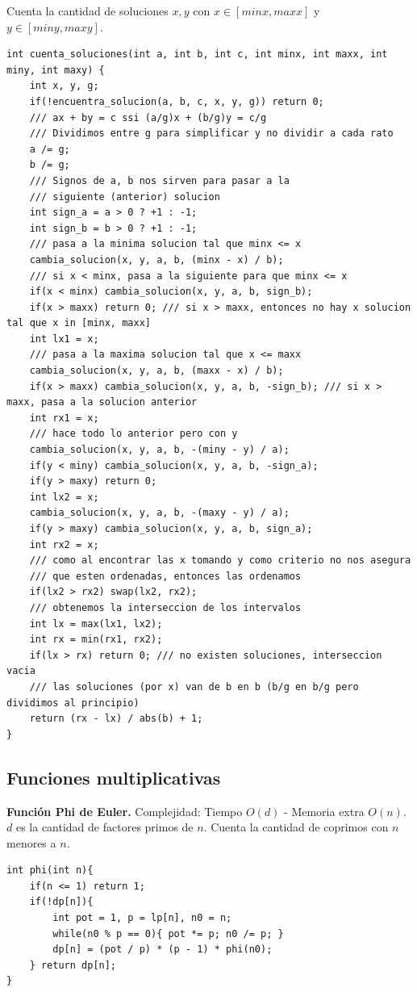\documentclass[10pt,spanish,mexico]{article}
\numberwithin{equation}{section}
\begin{document}
\begin{multicols}{2}
Cuenta la cantidad de soluciones $x, y$ con $x \in [minx, maxx]$ y $y \in [miny, maxy]$.
\begin{verbatim}
int cuenta_soluciones(int a, int b, int c, int minx, int maxx, int miny, int maxy) {
    int x, y, g;
    if(!encuentra_solucion(a, b, c, x, y, g)) return 0;
    /// ax + by = c ssi (a/g)x + (b/g)y = c/g
    /// Dividimos entre g para simplificar y no dividir a cada rato
    a /= g;
    b /= g;
    /// Signos de a, b nos sirven para pasar a la
    /// siguiente (anterior) solucion
    int sign_a = a > 0 ? +1 : -1;
    int sign_b = b > 0 ? +1 : -1;
    /// pasa a la minima solucion tal que minx <= x
    cambia_solucion(x, y, a, b, (minx - x) / b);
    /// si x < minx, pasa a la siguiente para que minx <= x
    if(x < minx) cambia_solucion(x, y, a, b, sign_b);
    if(x > maxx) return 0; /// si x > maxx, entonces no hay x solucion tal que x in [minx, maxx]
    int lx1 = x;
    /// pasa a la maxima solucion tal que x <= maxx
    cambia_solucion(x, y, a, b, (maxx - x) / b);
    if(x > maxx) cambia_solucion(x, y, a, b, -sign_b); /// si x > maxx, pasa a la solucion anterior
    int rx1 = x;
    /// hace todo lo anterior pero con y
    cambia_solucion(x, y, a, b, -(miny - y) / a);
    if(y < miny) cambia_solucion(x, y, a, b, -sign_a);
    if(y > maxy) return 0;
    int lx2 = x;
    cambia_solucion(x, y, a, b, -(maxy - y) / a);
    if(y > maxy) cambia_solucion(x, y, a, b, sign_a);
    int rx2 = x;
    /// como al encontrar las x tomando y como criterio no nos asegura
    /// que esten ordenadas, entonces las ordenamos
    if(lx2 > rx2) swap(lx2, rx2);
    /// obtenemos la interseccion de los intervalos
    int lx = max(lx1, lx2);
    int rx = min(rx1, rx2);
    if(lx > rx) return 0; /// no existen soluciones, interseccion vacia
    /// las soluciones (por x) van de b en b (b/g en b/g pero dividimos al principio)
    return (rx - lx) / abs(b) + 1;
}
\end{verbatim}

\vspace{-1.2\baselineskip}
\hrulefill
\subsection{Funciones multiplicativas}
\textbf{Función Phi de Euler.} Complejidad: Tiempo $O(d)$ - Memoria extra $O(n)$. $d$ es la cantidad de factores primos de $n$. Cuenta la cantidad de coprimos con $n$ menores a $n$.
\begin{verbatim}
int phi(int n){
    if(n <= 1) return 1;
    if(!dp[n]){
        int pot = 1, p = lp[n], n0 = n;
        while(n0 % p == 0){ pot *= p; n0 /= p; }
        dp[n] = (pot / p) * (p - 1) * phi(n0);
    } return dp[n];
}
\end{verbatim}


\end{multicols}
\end{document}
